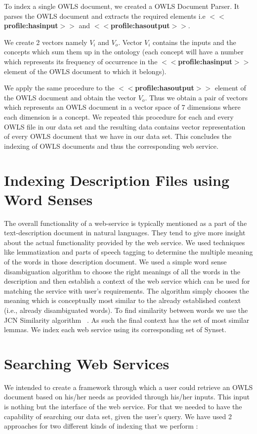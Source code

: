 \documentclass[12pt, oneside]{book}
\begin{document}
To index a single OWLS document, we created a OWLS Document Parser. It parses the OWLS document and extracts the required elements i.e \textbf{$<<$profile:hasinput$>>$} and \textbf{$<<$profile:hasoutput$>>$}. \\ \par
We create 2 vectors namely $V_{i}$ and $V_{o}$. Vector $V_{i}$ contains the inputs and the concepts which sum them up in the ontology (each concept will have a number which represents its frequency of occurrence in the \textbf{$<<$profile:hasinput$>>$} element of the OWLS document to which it belongs). \\ \par
We apply the same procedure to the \textbf{$<<$profile:hasoutput$>>$} element of the OWLS document and obtain the vector $V_{o}$. Thus we obtain a pair of vectors which represents an OWLS document in a vector space of 7 dimensions where each dimension is a concept. We repeated this procedure for each and every OWLS file in our data set and the resulting data contains vector representation of every OWLS document that we have in our data set. This concludes the indexing of OWLS documents and thus the corresponding web service.

\section{Indexing Description Files using Word Senses}
The overall functionality of a web-service is typically mentioned as a part of the text-description document in natural languages. They tend to give more insight about the actual functionality provided by the web service. We used techniques like lemmatization and parts of speech tagging to determine the multiple meaning of the words in those description document. We used a simple word sense disambiguation algorithm to choose the right meanings of all the words in the description and then establish a context of the web service which can be used for matching the service with user's requirements. The algorithm simply chooses the meaning which is conceptually most similar to the already established context (i.e., already disambiguated words). To find similarity between words we use the JCN Similarity algorithm ~\cite{jcn}. As such the final context has the set of most similar lemmas. We index each web service using its corresponding set of Synset.

\section{Searching Web Services}
We intended to create a framework through which a user could retrieve an OWLS document based on his/her needs as provided through his/her inputs. This input is nothing but the interface of the web service. For that we needed to have the capability of searching our data set, given the user's query. We have used 2 approaches for two different kinds of indexing that we perform :
\end{document}
